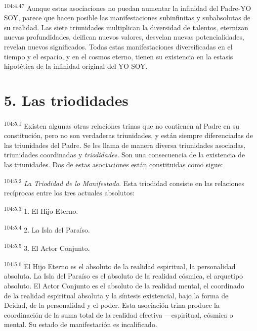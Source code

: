 \par
\textsuperscript{104:4.47} Aunque estas asociaciones no puedan aumentar la infinidad del Padre-YO SOY, parece que hacen posible las manifestaciones subinfinitas y subabsolutas de su realidad. Las siete triunidades multiplican la diversidad de talentos, eternizan nuevas profundidades, deifican nuevos valores, desvelan nuevas potencialidades, revelan nuevos significados. Todas estas manifestaciones diversificadas en el tiempo y el espacio, y en el cosmos eterno, tienen su existencia en la estasis hipotética de la infinidad original del YO SOY.

\section*{5. Las triodidades}
\par
\textsuperscript{104:5.1} Existen algunas otras relaciones trinas que no contienen al Padre en su constitución, pero no son verdaderas triunidades, y están siempre diferenciadas de las triunidades del Padre. Se les llama de manera diversa triunidades asociadas, triunidades coordinadas y \textit{triodidades}. Son una consecuencia de la existencia de las triunidades. Dos de estas asociaciones están constituidas como sigue:

\par
\textsuperscript{104:5.2} \textit{La Triodidad de lo Manifestado}. Esta triodidad consiste en las relaciones recíprocas entre los tres actuales absolutos:

\par
\textsuperscript{104:5.3} 1. El Hijo Eterno.

\par
\textsuperscript{104:5.4} 2. La Isla del Paraíso.

\par
\textsuperscript{104:5.5} 3. El Actor Conjunto.

\par
\textsuperscript{104:5.6} El Hijo Eterno es el absoluto de la realidad espiritual, la personalidad absoluta. La Isla del Paraíso es el absoluto de la realidad cósmica, el arquetipo absoluto. El Actor Conjunto es el absoluto de la realidad mental, el coordinado de la realidad espiritual absoluta y la síntesis existencial, bajo la forma de Deidad, de la personalidad y el poder. Esta asociación trina produce la coordinación de la suma total de la realidad efectiva ---espiritual, cósmica o mental. Su estado de manifestación es incalificado.

